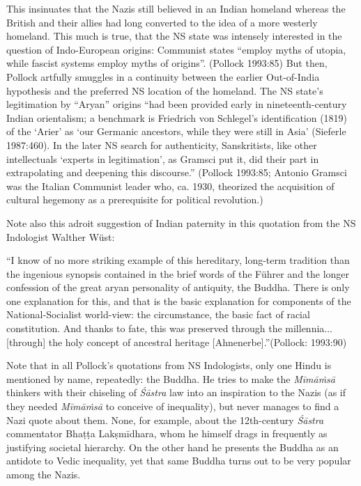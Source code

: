 This insinuates that the Nazis still believed in an Indian homeland whereas the British and their allies had long converted to the idea of a more westerly homeland. This much is true, that the NS state was intensely interested in the question of Indo-European origins: Communist states “employ myths of utopia, while fascist systems employ myths of origins”. (Pollock 1993:85) But then, Pollock artfully smuggles in a continuity between the earlier Out-of-India hypothesis and the preferred NS location of the homeland. The NS state’s legitimation by “Aryan” origins “had been provided early in nineteenth-century Indian orientalism; a benchmark is Friedrich von Schlegel's identification (1819) of the ‘Arier’ as ‘our Germanic ancestors, while they were still in Asia’ (Sieferle 1987:460). In the later NS search for authenticity, Sanskritists, like other intellectuals ‘experts in legitimation’, as Gramsci put it, did their part in extrapolating and deepening this discourse.” (Pollock 1993:85; Antonio Gramsci was the Italian Communist leader who, ca. 1930, theorized the acquisition of cultural hegemony as a prerequisite for political revolution.)

Note also this adroit suggestion of Indian paternity in this quotation from the NS Indologist Walther Wüst: 
\begin{myquote}
“I know of no more striking example of this hereditary, long-term tradition than the ingenious synopsis contained in the brief words of the Führer and the longer confession of the great aryan personality of antiquity, the Buddha. There is only one explanation for this, and that is the basic explanation for components of the National-Socialist world-view: the circumstance, the basic fact of racial constitution. And thanks to fate, this was preserved through the millennia$\ldots$ [through] the holy concept of ancestral heritage [Ahnenerbe].”\hfill (Pollock: 1993:90)
\end{myquote}

Note that in all Pollock’s quotations from NS Indologists, only one Hindu is mentioned by name, repeatedly: the Buddha. He tries to make the {\sl Mīmāṁsā} thinkers with their chiseling of {\sl Śāstra} law into an inspiration to the Nazis (as if they needed {\sl Mīmāṁsā} to conceive of inequality), but never manages to find a Nazi quote about them. None, for example, about the 12th-century {\sl Śāstra} commentator Bhaṭṭa Lakṣmīdhara, whom he himself drags in frequently as justifying societal hierarchy. On the other hand he presents the Buddha as an antidote to Vedic inequality, yet that same Buddha turns out to be very popular among the Nazis.

